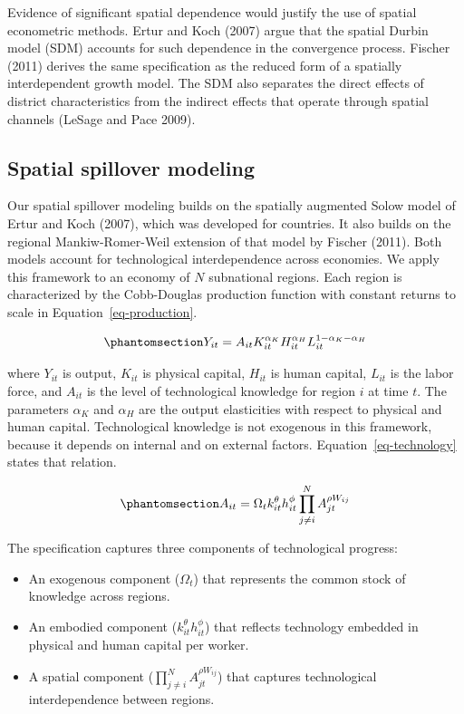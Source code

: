 \documentclass[
  letterpaper,
  DIV=11,
  numbers=noendperiod]{scrartcl}
\providecommand{\tightlist}{%
  \setlength{\itemsep}{0pt}\setlength{\parskip}{0pt}}
\begin{document}
Evidence of significant spatial dependence would justify the use of
spatial econometric methods. Ertur and Koch (2007) argue that the
spatial Durbin model (SDM) accounts for such dependence in the
convergence process. Fischer (2011) derives the same specification as
the reduced form of a spatially interdependent growth model. The SDM
also separates the direct effects of district characteristics from the
indirect effects that operate through spatial channels (LeSage and Pace
2009).

\subsection{Spatial spillover
modeling}\label{spatial-spillover-modeling}

Our spatial spillover modeling builds on the spatially augmented Solow
model of Ertur and Koch (2007), which was developed for countries. It
also builds on the regional Mankiw-Romer-Weil extension of that model by
Fischer (2011). Both models account for technological interdependence
across economies. We apply this framework to an economy of \(N\)
subnational regions. Each region is characterized by the Cobb-Douglas
production function with constant returns to scale in
Equation~\ref{eq-production}.

\begin{equation}\phantomsection\label{eq-production}{
Y_{i t}=A_{i t} K_{i t}^{\alpha_{K}} H_{i t}^{\alpha_{H}} L_{i t}^{1-\alpha_{K} -\alpha_{H}}
}\end{equation}

where \(Y_{it}\) is output, \(K_{it}\) is physical capital, \(H_{it}\)
is human capital, \(L_{it}\) is the labor force, and \(A_{it}\) is the
level of technological knowledge for region \(i\) at time \(t\). The
parameters \(\alpha_K\) and \(\alpha_H\) are the output elasticities
with respect to physical and human capital. Technological knowledge is
not exogenous in this framework, because it depends on internal and on
external factors. Equation~\ref{eq-technology} states that relation.

\begin{equation}\phantomsection\label{eq-technology}{
A_{i t}=\Omega_{t} k_{i t}^{\theta} h_{i t}^{\phi} \prod_{j \neq i}^{N} A_{j t}^{\rho W_{i j}}
}\end{equation}

The specification captures three components of technological progress:

\begin{itemize}
\tightlist
\item
  An exogenous component (\(\Omega_t\)) that represents the common stock
  of knowledge across regions.
\item
  An embodied component (\(k_{i t}^{\theta} h_{i t}^{\phi}\)) that
  reflects technology embedded in physical and human capital per worker.
\item
  A spatial component (\(\prod_{j \neq i}^{N} A_{j t}^{\rho W_{i j}}\))
  that captures technological interdependence between regions.
\end{itemize}
\end{document}
